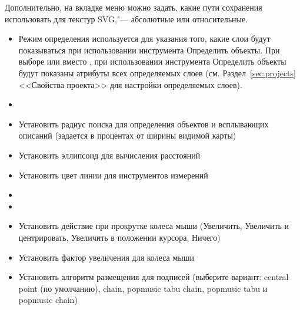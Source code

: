 Дополнительно, на вкладке  меню  \arrow
{} можно задать, какие пути
сохранения использовать для текстур SVG,"--- абсолютные или относительные.


\begin{itemize}
\item Режим определения используется для указания того, какие слои будут
показываться при использовании инструмента Определить объекты. При выборе
 или 
вместо , при использовании инструмента Определить
объекты будут показаны атрибуты всех определяемых слоев (см. Раздел~\ref{sec:projects}
<<Свойства проекта>> для настройки определяемых слоев).
\item {}
\item Установить радиус поиска для определения объектов и всплывающих
описаний (задается в процентах от ширины видимой карты)
\item Установить эллипсоид для вычисления расстояний
\item Установить цвет линии для инструментов измерений
\item {}
\item {}
\item Установить действие при прокрутке колеса мыши (Увеличить, Увеличить
и центрировать, Увеличить в положении курсора, Ничего)
\item Установить фактор увеличения для колеса мыши
\end{itemize}


\begin{itemize}
\item Установить алгоритм размещения для подписей (выберите вариант: central
point (по умолчанию), chain, popmusic tabu chain, popmusic tabu и
popmusic chain)
\end{itemize}


